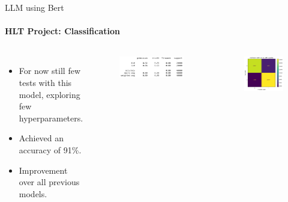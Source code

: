 \documentclass{beamer}
\theoremstyle{definition}
\theoremstyle{plain}
\begin{document}
\begin{frame}{LLM using Bert}
\framesubtitle{HLT Project: Classification}

\begin{columns}
    \vspace{-1cm}
    {\small 
        \begin{itemize}
            \item For now still few tests with this model, exploring few hyperparameters.
            \item Achieved an accuracy of 91\%.
            \item Improvement over all previous models.
        \end{itemize}
    }

    \vspace{-0.3cm}
    \begin{figure}
        \centering
        \includegraphics[scale=0.4]{Figures/classifier_acc.png}
    \end{figure}
    \vspace{-0.3cm}
    \begin{figure}
        \centering
        \includegraphics[scale=0.35]{Figures/classifier.png}
    \end{figure}
\end{columns}
\end{frame}
\end{document}
